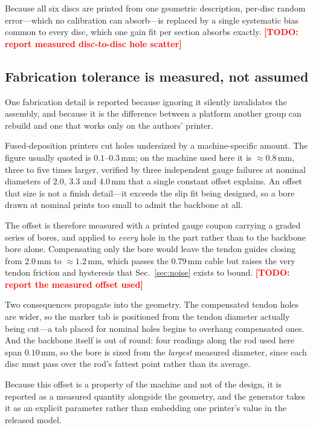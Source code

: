 \documentclass[letterpaper, 10pt, conference]{ieeeconf}
\newcommand{\todo}[1]{\textcolor{red}{\textbf{[TODO: #1]}}}
\begin{document}
Because all six discs are printed from one geometric description, per-disc
random error---which no calibration can absorb---is replaced by a single
systematic bias common to every disc, which one gain fit per section absorbs
exactly. \todo{report measured disc-to-disc hole scatter}

\subsection{Fabrication tolerance is measured, not assumed}
\label{sec:fab}

One fabrication detail is reported because ignoring it silently invalidates
the assembly, and because it is the difference between a platform another
group can rebuild and one that works only on the authors' printer.

Fused-deposition printers cut holes undersized by a machine-specific amount.
The figure usually quoted is $0.1$--$0.3\,$mm; on the machine used here it is
$\approx\!0.8\,$mm, three to five times larger, verified by three independent
gauge failures at nominal diameters of $2.0$, $3.3$ and $4.0\,$mm that a
single constant offset explains. An offset that size is not a finish
detail---it exceeds the slip fit being designed, so a bore drawn at nominal
prints too small to admit the backbone at all.

The offset is therefore measured with a printed gauge coupon carrying a
graded series of bores, and applied to \emph{every} hole in the part rather
than to the backbone bore alone. Compensating only the bore would leave the
tendon guides closing from $2.0\,$mm to $\approx\!1.2\,$mm, which passes the
$0.79\,$mm cable but raises the very tendon friction and hysteresis that
Sec.~\ref{sec:noise} exists to bound. \todo{report the measured offset used}

Two consequences propagate into the geometry. The compensated tendon holes
are wider, so the marker tab is positioned from the tendon diameter actually
being cut---a tab placed for nominal holes begins to overhang compensated
ones. And the backbone itself is out of round: four readings along the rod
used here span $0.10\,$mm, so the bore is sized from the \emph{largest}
measured diameter, since each disc must pass over the rod's fattest point
rather than its average.

Because this offset is a property of the machine and not of the design, it is
reported as a measured quantity alongside the geometry, and the generator
takes it as an explicit parameter rather than embedding one printer's value
in the released model.
\end{document}
